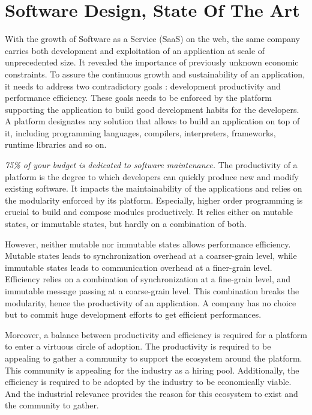 \chapter{Software Design, State Of The Art} \label{chapter3}
\minitoc
\eject


With the growth of Software as a Service (SaaS) on the web, the same company carries both development and exploitation of an application at scale of unprecedented size.
It revealed the importance of previously unknown economic constraints.
To assure the continuous growth and sustainability of an application, it needs to address two contradictory goals : development productivity and performance efficiency.
These goals needs to be enforced by the platform supporting the application to build good development habits for the developers.
A platform designates any solution that allows to build an application on top of it, including programming languages, compilers, interpreters, frameworks, runtime libraries and so on.

\textit{75\% of your budget is dedicated to software maintenance.}
The productivity of a platform is the degree to which developers can quickly produce new and modify existing software.
It impacts the maintainability of the applications and relies on the modularity enforced by its platform.
Especially, higher order programming is crucial to build and compose modules productively.
It relies either on mutable states, or immutable states, but hardly on a combination of both.

However, neither mutable nor immutable states allows performance efficiency.
Mutable states leads to synchronization overhead at a coarser-grain level, while immutable states leads to communication overhead at a finer-grain level.
Efficiency relies on a combination of synchronization at a fine-grain level, and immutable message passing at a coarse-grain level.
This combination breaks the modularity, hence the productivity of an application.
A company has no choice but to commit huge development efforts to get efficient performances.

Moreover, a balance between productivity and efficiency is required for a platform to enter a virtuous circle of adoption.
The productivity is required to be appealing to gather a community to support the ecosystem around the platform.
This community is appealing for the industry as a hiring pool.
Additionally, the efficiency is required to be adopted by the industry to be economically viable.
And the industrial relevance provides the reason for this ecosystem to exist and the community to gather.

